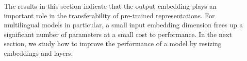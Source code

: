 \documentclass{article} \usepackage{iclr2021_conference,times}
\begin{document}
The results in this section indicate that the output embedding plays an important role in the transferability of pre-trained representations. For multilingual models in particular, a small input embedding dimension frees up a significant number of parameters at a small cost to performance. In the next section, we study how to improve the performance of a model by resizing embeddings and layers.

\begin{table*}[t]
\caption{Performance of models with a large input and small output embedding size and vice versa.}
\label{table:input_vs_output_embeddings}
\begin{center}
\end{center}
\end{table*}
\end{document}
